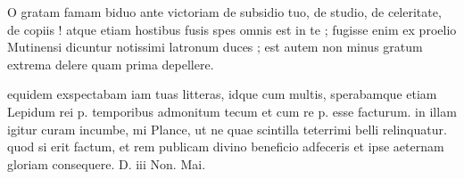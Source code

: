 


 O gratam famam biduo ante victoriam de subsidio tuo, de studio, de celeritate, de copiis ! atque etiam hostibus fusis spes omnis est in te ; fugisse enim ex proelio Mutinensi dicuntur notissimi latronum duces ; est autem non minus gratum extrema delere quam prima depellere.

 equidem exspectabam iam tuas litteras, idque cum multis, sperabamque etiam Lepidum rei p. temporibus admonitum tecum et cum re p. esse facturum. in illam igitur curam incumbe, mi Plance, ut ne quae scintilla teterrimi belli relinquatur. quod si erit factum, et rem publicam divino beneficio adfeceris et ipse aeternam gloriam consequere. D. iii Non. Mai.
